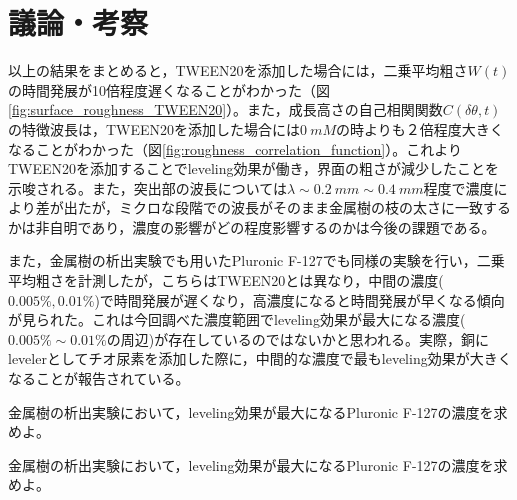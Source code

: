 \documentclass[autodetect-engine,dvi=dvipdfmx,a4paper,ja=standard,oneside,openany,11pt,draft]{bxjsbook}
\begin{document}
\section{議論・考察}
以上の結果をまとめると，TWEEN20を添加した場合には，二乗平均粗さ$W(t)$の時間発展が10倍程度遅くなることがわかった（図\ref{fig:surface_roughness_TWEEN20}）。また，成長高さの自己相関関数$C(\delta\theta,t)$の特徴波長は，TWEEN20を添加した場合には$\SI{0}{mM}$の時よりも２倍程度大きくなることがわかった（図\ref{fig:roughness_correlation_function}）。これよりTWEEN20を添加することでleveling効果が働き，界面の粗さが減少したことを示唆される。また，突出部の波長については$\lambda\sim\SI{0.2}{mm}\sim\SI{0.4}{mm}$程度で濃度により差が出たが，ミクロな段階での波長がそのまま金属樹の枝の太さに一致するかは非自明であり，濃度の影響がどの程度影響するのかは今後の課題である。

また，金属樹の析出実験でも用いたPluronic F-127でも同様の実験を行い，二乗平均粗さを計測したが，こちらはTWEEN20とは異なり，中間の濃度($0.005\%,0.01\%$)で時間発展が遅くなり，高濃度になると時間発展が早くなる傾向が見られた。これは今回調べた濃度範囲でleveling効果が最大になる濃度($0.005\%\sim0.01\%$の周辺)が存在しているのではないかと思われる。実際，銅にlevelerとしてチオ尿素を添加した際に，中間的な濃度で最もleveling効果が大きくなることが報告されている\cite{schilardi2000stable}。

\begin{defi}
  金属樹の析出実験において，leveling効果が最大になるPluronic F-127の濃度を求めよ。
\end{defi}

\begin{prob}
  金属樹の析出実験において，leveling効果が最大になるPluronic F-127の濃度を求めよ。
\end{prob}
\ifdraft{
  
  
}{}
\end{document}

